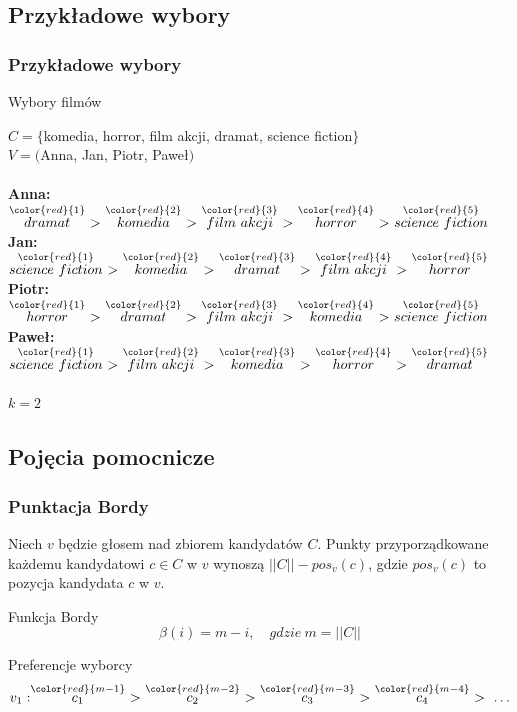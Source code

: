 \documentclass{beamer}
\newcommand{\red}[1]{
	{ \color{red}{#1} }
}
\newcommand{\score}[2]{
	\stackrel
	{\red{#1}}
	{#2}
}
\begin{document}
\subsection{Przykładowe wybory}
\begin{frame}
\frametitle{Przykładowe wybory}
\begin{exampleblock}{Wybory filmów}


$ C = \{$komedia, horror, film akcji, dramat, science fiction$\} $ \\
$ V = ($Anna, Jan, Piotr, Paweł$) $ \\ ~ \\
 \textbf{Anna:}  $\score{1}{dramat} \ > \ \score{2}{komedia} \ > \ \score{3}{film \ akcji} \ > \ \score{4}{horror} \ > \ \score{5}{science \ fiction}$\\
 \textbf{Jan:}  $\score{1}{science \ fiction} \ > \ \score{2}{komedia} \ > \ \score{3}{dramat} \ > \ \score{4}{film \ akcji} \ > \ \score{5}{horror}$ \\
 \textbf{Piotr:} $\score{1}{horror} \ > \ \score{2}{dramat} \ > \ \score{3}{film \ akcji} \ > \ \score{4}{komedia} \ > \ \score{5}{science \ fiction}$\\
 \textbf{Paweł:} $\score{1}{science \ fiction} \ > \ \score{2}{film \ akcji} \ > \ \score{3}{komedia} \ > \ \score{4}{horror} \ > \ \score{5}{dramat}$\\ ~ \\
$ k = 2 $


\end{exampleblock}
\end{frame}

\subsection{Pojęcia pomocnicze}

\begin{frame}
\frametitle{Punktacja Bordy}

Niech $v$ będzie głosem nad zbiorem kandydatów $C$.
Punkty przyporządkowane każdemu kandydatowi $c \in C$ w $v$ wynoszą
$||C|| - pos_v(c)$, gdzie $pos_v(c)$ to pozycja kandydata $c$ w $v$.

\begin{exampleblock}{Funkcja Bordy}
$$
\beta(i) = m-i, \quad gdzie \ m = ||C||
$$
\end{exampleblock}

\begin{exampleblock}{Preferencje wyborcy}
$$ 
v_1: \score{m-1}{c_1} \ > \ \score{m-2}{c_2} \ > \ \score{m-3}{c_3} \ > \ \score{m-4}{c_4} \ > \ \ldots
$$
\end{exampleblock}

\end{frame}
\end{document}
